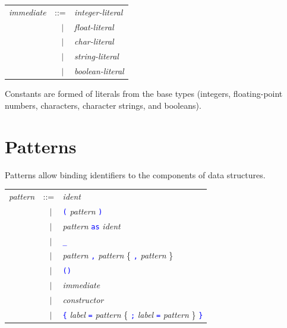 \documentclass[11pt,titlepage,twoside]{report}
\newcommand{\alt}{\;|\;}
\newcommand{\term}[1]{\textcolor{Blue}{\tt #1}}
\newcommand{\nterm}[1]{\textcolor{BrickRed}{\it #1}}
\newcommand{\term}[1]{{\tt #1}}
\newcommand{\nterm}[1]{{\em #1}}
\begin{document}
\begin{center}
\begin{tabular}{lcl}
\nterm{immediate} & ::=           & \nterm{integer-literal} \\
                  & $\;\;\alt$    & \nterm{float-literal} \\
                  & $\;\;\alt$    & \nterm{char-literal} \\
                  & $\;\;\alt$    & \nterm{string-literal} \\
                  & $\;\;\alt$    & \nterm{boolean-literal} \\
\end{tabular}
\end{center}
Constants are formed of literals from the base types (integers,
floating-point numbers, characters, character strings, and booleans).

\section{Patterns\label{patterns}} %

Patterns allow binding identifiers to the components of data structures.

\begin{center}
\begin{tabular}{lcl}
\nterm{pattern} & ::=        & \nterm{ident} \\
                & $\;\;\alt$ & \term{(} \nterm{pattern} \term{)} \\
                & $\;\;\alt$ & \nterm{pattern} \term{as} \nterm{ident} \\
                & $\;\;\alt$ & \term{\_} \\
                & $\;\;\alt$ & \nterm{pattern} \term{,} \nterm{pattern} 
                               \{ \term{,} \nterm{pattern} \} \\
                & $\;\;\alt$ & \term{()} \\
                & $\;\;\alt$ & \nterm{immediate} \\
                & $\;\;\alt$ & \nterm{constructor} \\
                & $\;\;\alt$ & \term{\{} \nterm{label} 
                               \term{=} \nterm{pattern} \{ \term{;} 
                               \nterm{label} \term{=} \nterm{pattern}
                               \} \term{\}}
\end{tabular}
\end{center}
\end{document}
